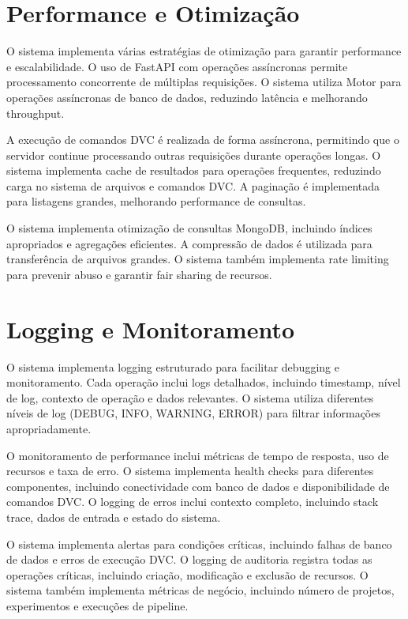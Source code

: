 \documentclass[12pt,a4paper]{article}
\begin{document}
\section{Performance e Otimização}

O sistema implementa várias estratégias de otimização para garantir performance e escalabilidade. O uso de FastAPI com operações assíncronas permite processamento concorrente de múltiplas requisições. O sistema utiliza Motor para operações assíncronas de banco de dados, reduzindo latência e melhorando throughput.

A execução de comandos DVC é realizada de forma assíncrona, permitindo que o servidor continue processando outras requisições durante operações longas. O sistema implementa cache de resultados para operações frequentes, reduzindo carga no sistema de arquivos e comandos DVC. A paginação é implementada para listagens grandes, melhorando performance de consultas.

O sistema implementa otimização de consultas MongoDB, incluindo índices apropriados e agregações eficientes. A compressão de dados é utilizada para transferência de arquivos grandes. O sistema também implementa rate limiting para prevenir abuso e garantir fair sharing de recursos.

\section{Logging e Monitoramento}

O sistema implementa logging estruturado para facilitar debugging e monitoramento. Cada operação inclui logs detalhados, incluindo timestamp, nível de log, contexto de operação e dados relevantes. O sistema utiliza diferentes níveis de log (DEBUG, INFO, WARNING, ERROR) para filtrar informações apropriadamente.

O monitoramento de performance inclui métricas de tempo de resposta, uso de recursos e taxa de erro. O sistema implementa health checks para diferentes componentes, incluindo conectividade com banco de dados e disponibilidade de comandos DVC. O logging de erros inclui contexto completo, incluindo stack trace, dados de entrada e estado do sistema.

O sistema implementa alertas para condições críticas, incluindo falhas de banco de dados e erros de execução DVC. O logging de auditoria registra todas as operações críticas, incluindo criação, modificação e exclusão de recursos. O sistema também implementa métricas de negócio, incluindo número de projetos, experimentos e execuções de pipeline.
\end{document}
